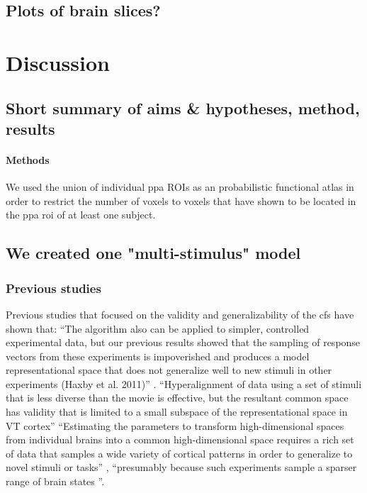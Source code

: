 \subsection{Plots of brain slices?}






\section{Discussion}



\subsection{Short summary of aims \& hypotheses, method, results}


%
\paragraph{Methods} We used the union of individual \ac{ppa} ROIs as an
probabilistic functional atlas in order to restrict the number of voxels to
voxels that have shown to be located in the \ac{ppa} \ac{roi} of at least one
subject.


\subsection{We created one "multi-stimulus" model}

\subsubsection{Previous studies}

Previous studies \citep{guntupalli2016model, haxby2020hyperalignment} that
focused on the validity and generalizability of the \ac{cfs} have shown that:
%
``The algorithm also can be applied to simpler, controlled experimental data,
but our previous results showed that the sampling of response vectors from these
experiments is impoverished and produces a model representational space that
does not generalize well to new stimuli in other experiments (Haxby et al.
2011)'' \citep{guntupalli2016model}.
%
``Hyperalignment of data using a set of stimuli that is less diverse than the
movie is effective, but the resultant common space has validity that is limited
to a small subspace of the representational space in VT cortex''
\citep{haxby2011common}
%
``Estimating the parameters to transform high-dimensional spaces from individual
brains into a common high-dimensional space requires a rich set of data that
samples a wide variety of cortical patterns in order to generalize to novel
stimuli or tasks'' \citep{haxby2020hyperalignment}, ``presumably because such
experiments sample a sparser range of brain states
\citep{guntupalli2016model}''.


